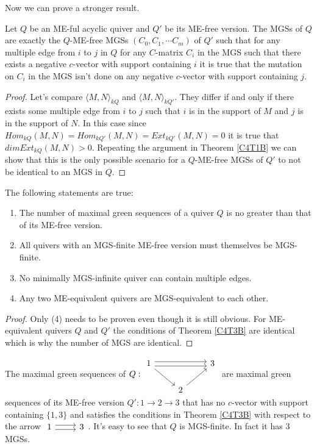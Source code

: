 \indent Now we can prove a stronger result.\\
\begin{theorem}\label{C4T3B}
Let $Q$ be an ME-ful acyclic quiver and $Q'$ be its ME-free version. The MGSs of $Q$ are exactly the $Q$-ME-free MGSs $(C_0,C_1,\cdots C_m)$ of $Q'$ such that for any multiple edge from $i$ to $j$ in $Q$ for any $C$-matrix $C_i$ in the MGS such that there exists a negative $c$-vector with support containing $i$ it is true that the mutation on $C_i$ in the MGS isn't done on any negative $c$-vector with support containing $j$.
\end{theorem}
\begin{proof}
Let's compare $\langle M, N \rangle_{kQ}$ and $\langle M, N \rangle_{kQ'}$. They differ if and only if there exists some multiple edge from $i$ to $j$ such that $i$ is in the support of $M$ and $j$ is in the support of $N$. In this case since $Hom_{kQ}(M,N) = Hom_{kQ'}(M,N)  = Ext_{kQ'}(M,N) = 0$ it is true that $dim Ext_{kQ}(M,N) > 0$. Repeating the argument in Theorem \ref{C4T1B} we can show that this is the only possible scenario for a $Q$-ME-free MGSs of $Q'$ to not be identical to an MGS in $Q$.
\end{proof}
\begin{corollary}\label{C4CB}
The following statements are true:
\begin{enumerate}
\item The number of maximal green sequences of a quiver $Q$ is no greater than that of its ME-free version.
\item All quivers with an MGS-finite ME-free version must themselves be MGS-finite.
\item No minimally MGS-infinite quiver can contain multiple edges.
\item Any two ME-equivalent quivers are MGS-equivalent to each other.
\end{enumerate}
\end{corollary}
\begin{proof}
\indent Only (4) needs to be proven even though it is still obvious. For ME-equivalent quivers $Q$ and $Q'$ the conditions of Theorem \ref{C4T3B} are identical which is why the number of MGS are identical.
\end{proof}
\begin{example}
The maximal green sequences of $Q: \begin{tikzcd}
1\righttwicedoublearrow\arrow[rd] &  & 3\\
 & 2\arrow[ur]
\end{tikzcd}$ are maximal green sequences of its ME-free version $Q': 1\to 2\to 3$ that has no $c$-vector with support containing $\{1,3\}$ and satisfies the conditions in Theorem \ref{C4T3B} with respect to the arrow $\begin{tikzcd} 1\rightdoublearrow & 3\end{tikzcd}$. It's easy to see that $Q$ is MGS-finite. In fact it has 3 MGSs.
\end{example}
